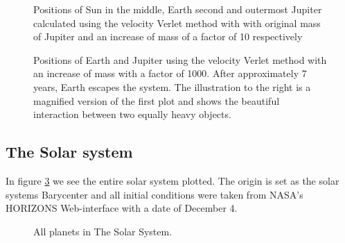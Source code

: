 \documentclass[../main.tex]{subfiles}
\begin{document}
\begin{figure}[!h]
  \centering
  \caption{Positions of Sun in the middle, Earth second and outermost Jupiter calculated using the velocity Verlet method with with original mass of Jupiter and an increase of mass of a factor of 10 respectively}
  \label{fig:SunEarthJupiter10}
\end{figure}

\begin{figure}[!h]
  \centering
  \caption{Positions of Earth and Jupiter using the velocity Verlet method with an increase of mass with a factor of 1000. After approximately 7 years, Earth escapes the system. The illustration to the right is a magnified version of the first plot and shows the beautiful interaction between two equally heavy objects.}
  \label{fig:SunEarthJupiter1000}
\end{figure}
\FloatBarrier


\subsection{The Solar system} \label{sec:results-entire-solar-system}
In figure \ref{fig:allPlanets} we see the entire solar system plotted. The origin is set as the solar systems Barycenter and all initial conditions were taken from NASA's HORIZONS Web-interface \cite{HorizonsNASA} with a date of December 4.

\begin{figure}[!h]
  \centering
  \caption{All planets in The Solar System.}
  \label{fig:allPlanets}
\end{figure}
\end{document}

